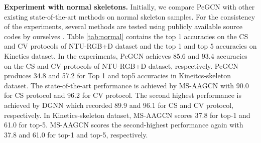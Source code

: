 \documentclass[runningheads]{llncs}
\begin{document}
\textbf{Experiment with normal skeletons.} Initially, we compare PeGCN with other existing state-of-the-art methods on normal skeleton samples. For the consistency of the experiments, several methods are tested using publicly available source codes by ourselves \cite{yan2018spatial,song2019richly,thakkar2018part,shi2019two}. Table \ref{tab:normal} contains the top 1 accuracies on the CS and CV protocols of NTU-RGB+D dataset and the top 1 and top 5 accuracies on Kinetics dataset. In the experiments, PeGCN achieves 85.6 and 93.4 accuracies on the CS and CV protocols of NTU-RGB+D dataset, respectively. PeGCN produces 34.8 and 57.2 for Top 1 and top5 accuracies in Kineitcs-skeleton dataset. The state-of-the-art performance is achieved by MS-AAGCN \cite{shi2019multi} with 90.0 for CS protocol and 96.2 for CV protocol. The second highest performance is achieved by DGNN \cite{shi2019skeleton} which recorded 89.9 and 96.1 for CS and CV protocol, respectively. In Kinetics-skeleton dataset, MS-AAGCN \cite{shi2019multi} scores 37.8 for top-1 and 61.0 for top-5. MS-AAGCN scores the second-highest performance again with 37.8 and 61.0 for top-1 and top-5, respectively.
\end{document}
